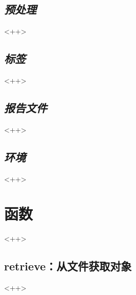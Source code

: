 \subsection{\emph{预处理}}
<++>

\subsection{\emph{标签}}
<++>

\subsection{\emph{报告文件}}
<++>

\subsection{\emph{环境}}
<++>

\section{函数}
<++>

\subsection{retrieve：从文件获取对象}
<++>

